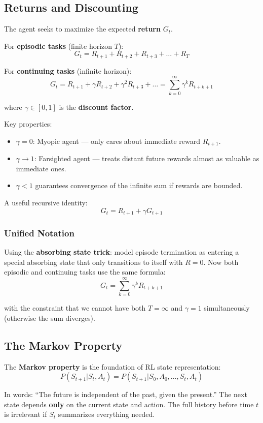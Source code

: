 \documentclass[11pt,a4paper]{article}
\begin{document}
\subsection{Returns and Discounting}

The agent seeks to maximize the expected \textbf{return} $G_t$.

For \textbf{episodic tasks} (finite horizon $T$):
\[
G_t = R_{t+1} + R_{t+2} + R_{t+3} + \ldots + R_T
\]

For \textbf{continuing tasks} (infinite horizon):
\[
G_t = R_{t+1} + \gamma R_{t+2} + \gamma^2 R_{t+3} + \ldots = \sum_{k=0}^{\infty} \gamma^k R_{t+k+1}
\]

where $\gamma \in [0, 1]$ is the \textbf{discount factor}.

Key properties:
\begin{itemize}
    \item $\gamma = 0$: Myopic agent --- only cares about immediate reward $R_{t+1}$.
    \item $\gamma \to 1$: Farsighted agent --- treats distant future rewards almost as valuable as immediate ones.
    \item $\gamma < 1$ guarantees convergence of the infinite sum if rewards are bounded.
\end{itemize}

A useful recursive identity:
\[
G_t = R_{t+1} + \gamma G_{t+1}
\]

\subsubsection{Unified Notation}

Using the \textbf{absorbing state trick}: model episode termination as entering a special absorbing state that only transitions to itself with $R = 0$. Now both episodic and continuing tasks use the same formula:
\[
G_t = \sum_{k=0}^{\infty} \gamma^k R_{t+k+1}
\]

with the constraint that we cannot have both $T = \infty$ and $\gamma = 1$ simultaneously (otherwise the sum diverges).

\subsection{The Markov Property}

The \textbf{Markov property} is the foundation of RL state representation:
\[
P(S_{t+1} | S_t, A_t) = P(S_{t+1} | S_0, A_0, \ldots, S_t, A_t)
\]

In words: ``The future is independent of the past, given the present.'' The next state depends \textbf{only} on the current state and action. The full history before time $t$ is irrelevant if $S_t$ summarizes everything needed.
\end{document}

